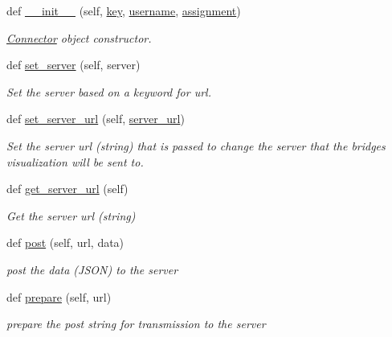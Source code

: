 \begin{DoxyCompactItemize}
\item 
def \hyperlink{classbridges_1_1connector_1_1_connector_a2d5af7535b60c92433f2333951b7ea69}{\+\_\+\+\_\+init\+\_\+\+\_\+} (self, \hyperlink{classbridges_1_1connector_1_1_connector_a3b577c34402fea1910f56fd9cac51c07}{key}, \hyperlink{classbridges_1_1connector_1_1_connector_af2f4f996092cf63a5e7940ca93a2c6b7}{username}, \hyperlink{classbridges_1_1connector_1_1_connector_a2df020c062b6224d4eeb2c5407c02656}{assignment})
\begin{DoxyCompactList}\small\item\em \hyperlink{classbridges_1_1connector_1_1_connector}{Connector} object constructor. \end{DoxyCompactList}\item 
def \hyperlink{classbridges_1_1connector_1_1_connector_aabe66803d7701015138288c5ceeba81f}{set\+\_\+server} (self, server)
\begin{DoxyCompactList}\small\item\em Set the server based on a keyword for url. \end{DoxyCompactList}\item 
def \hyperlink{classbridges_1_1connector_1_1_connector_a6cfa754618584132754cea9a8bde5282}{set\+\_\+server\+\_\+url} (self, \hyperlink{classbridges_1_1connector_1_1_connector_abcc06e345e43916cf975eb200187d911}{server\+\_\+url})
\begin{DoxyCompactList}\small\item\em Set the server url (string) that is passed to change the server that the bridges visualization will be sent to. \end{DoxyCompactList}\item 
def \hyperlink{classbridges_1_1connector_1_1_connector_a1db4c60fd9c2817c2ff237bdfb98e4a9}{get\+\_\+server\+\_\+url} (self)
\begin{DoxyCompactList}\small\item\em Get the server url (string) \end{DoxyCompactList}\item 
def \hyperlink{classbridges_1_1connector_1_1_connector_abfc36138302d5ec49219cb3ccf48439a}{post} (self, url, data)
\begin{DoxyCompactList}\small\item\em post the data (J\+S\+ON) to the server \end{DoxyCompactList}\item 
def \hyperlink{classbridges_1_1connector_1_1_connector_afcd39dd1f2f37a945e16254e0fed178b}{prepare} (self, url)
\begin{DoxyCompactList}\small\item\em prepare the post string for transmission to the server \end{DoxyCompactList}\end{DoxyCompactItemize}
